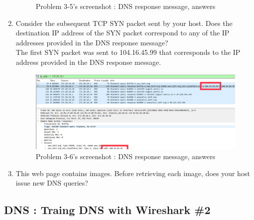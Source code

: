\begin{enumerate}[label=\bfseries Problem \arabic*:,leftmargin=*,labelindent=1em]
\begin{figure}[!h]
        		\caption{\footnotesize Problem 3-5's screenshot : DNS response message, answers}
        		\vspace{-10pt}
            \end{figure}
        \item Consider the subsequent TCP SYN packet sent by your host.
        Does the destination IP address of the SYN packet correspond to any of the IP addresses 
        provided in the DNS response message?\\[0.2mm]
            \soln The first SYN packet was sent to 104.16.45.99 that corresponds to the IP address provided in the DNS response message.
            \vspace{-2mm}  
            \begin{figure}[!h]\centering
        		\includegraphics[width=.78\textwidth]{image/result_week01/Q3-6.png}
        		\caption{\footnotesize Problem 3-6's screenshot : DNS response message, answers}
        		\vspace{-10pt}
            \end{figure}
            
        \item This web page contains images. Before retrieving each image, 
        does your host issue new DNS queries?\\[0.2mm]
            \soln
            
    \end{enumerate}
\subsection{DNS : Traing DNS with Wireshark \#2}
